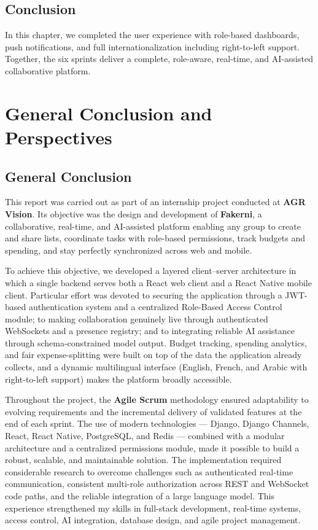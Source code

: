 \documentclass[12pt,a4paper,oneside]{report}
\newcommand{\myCompany}{AGR Vision}
\begin{document}
\section{Conclusion}
In this chapter, we completed the user experience with role-based dashboards, push
notifications, and full internationalization including right-to-left support.
Together, the six sprints deliver a complete, role-aware, real-time, and
AI-assisted collaborative platform.

\chapter*{General Conclusion and Perspectives}

\section*{General Conclusion}
This report was carried out as part of an internship project conducted at
\textbf{\myCompany}. Its objective was the design and development of
\textbf{Fakerni}, a collaborative, real-time, and AI-assisted platform enabling any
group to create and share lists, coordinate tasks with role-based permissions,
track budgets and spending, and stay perfectly synchronized across web and mobile.

To achieve this objective, we developed a layered client--server architecture in
which a single backend serves both a React web client and a React Native mobile
client. Particular effort was devoted to securing the application through a
JWT-based authentication system and a centralized Role-Based Access Control module;
to making collaboration genuinely live through authenticated WebSockets and a
presence registry; and to integrating reliable AI assistance through
schema-constrained model output. Budget tracking, spending analytics, and fair
expense-splitting were built on top of the data the application already collects,
and a dynamic multilingual interface (English, French, and Arabic with
right-to-left support) makes the platform broadly accessible.

Throughout the project, the \textbf{Agile Scrum} methodology ensured adaptability
to evolving requirements and the incremental delivery of validated features at the
end of each sprint. The use of modern technologies --- Django, Django Channels,
React, React Native, PostgreSQL, and Redis --- combined with a modular architecture
and a centralized permissions module, made it possible to build a robust, scalable,
and maintainable solution. The implementation required considerable research to
overcome challenges such as authenticated real-time communication, consistent
multi-role authorization across REST and WebSocket code paths, and the reliable
integration of a large language model. This experience strengthened my skills in
full-stack development, real-time systems, access control, AI integration, database
design, and agile project management.
\end{document}
